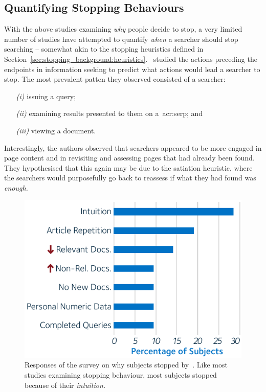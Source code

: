 \subsection{Quantifying Stopping Behaviours}
With the above studies examining \emph{why} people decide to stop, a very limited number of studies have attempted to quantify \emph{when} a searcher should stop searching -- somewhat akin to the stopping heuristics defined in Section~\ref{sec:stopping_background:heuristics}.~\cite{toms2009predicting_stopping} studied the actions preceding the endpoints in information seeking to predict what actions would lead a searcher to stop. The most prevalent patten they observed consisted of a searcher:

\begin{itemize}
    \item[\emph{(i)}]{issuing a query;}
    \item[\emph{(ii)}]{examining results presented to them on a~\gls{acr:serp}; and}
    \item[\emph{(iii)}]{viewing a document.}
\end{itemize}

Interestingly, the authors observed that searchers appeared to be more engaged in page content and in revisiting and assessing pages that had already been found. They hypothesised that this again may be due to the satiation heuristic, where the searchers would purposefully go back to reassess if what they had found was \emph{enough.}

\begin{figure}
    \begin{center}
    \vspace*{-10mm}
    \includegraphics[width=1\textwidth]{figures/ch3-respondents.pdf}
    \end{center}
    \vspace*{-4mm}
    \caption[Responses of a survey by~\cite{dostert2009satisficing}]{Responses of the survey on why subjects stopped by~\cite{dostert2009satisficing}. Like most studies examining stopping behaviour, most subjects stopped because of their \emph{intuition.}}
    \label{fig:stopping_respondents}
\end{figure}

